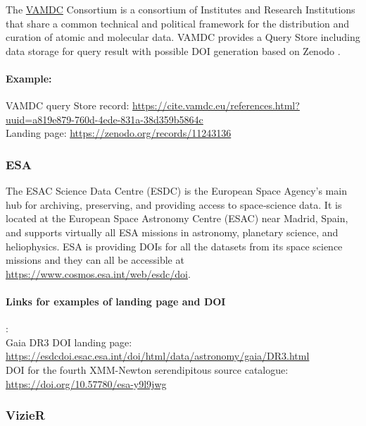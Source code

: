 \documentclass[11pt,a4paper]{ivoa}
\begin{document}
The \href{https://vamdc.org/}{VAMDC} Consortium is a consortium of Institutes and Research Institutions that share a common technical and political framework for the distribution and curation of atomic and molecular data. VAMDC provides a Query Store including data storage for query result with possible DOI generation based on Zenodo \citep{2018Galax...6..105M}.

\paragraph{Example:} VAMDC query Store record: \newline
\url{https://cite.vamdc.eu/references.html?uuid=a819e879-760d-4ede-831a-38d359b5864c}\\
Landing page: \url{https://zenodo.org/records/11243136}

\subsubsection{ESA}\hypertarget{esa}{}\label{esa}

The ESAC Science Data Centre (ESDC) is the European Space Agency’s main hub for archiving, preserving, and providing access to space‑science data. It is located at the European Space Astronomy Centre (ESAC) near Madrid, Spain, and supports virtually all ESA missions in astronomy, planetary science, and heliophysics. ESA is providing DOIs for all the datasets from its space science missions and they can all be accessible at \url{https://www.cosmos.esa.int/web/esdc/doi}.



\paragraph{Links for examples of landing page and DOI}:\\
Gaia DR3 DOI landing page: \url{https://esdcdoi.esac.esa.int/doi/html/data/astronomy/gaia/DR3.html} \\
DOI for the fourth XMM-Newton serendipitous source catalogue: \url{https://doi.org/10.57780/esa-y9l9jwg} 


\subsubsection{VizieR}\hypertarget{vizier}{}\label{sec:vizier}
\end{document}

